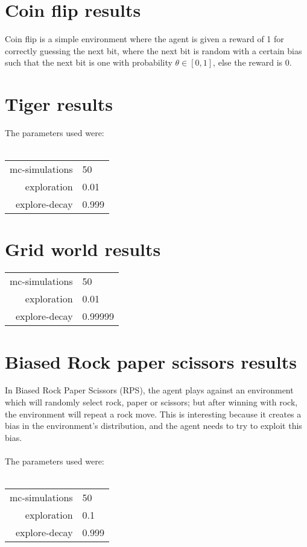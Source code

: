 \documentclass[pdftex,twoside,a4paper]{report}
\begin{document}
\section{Coin flip results}
Coin flip is a simple environment where the agent is given a reward of 1 for correctly guessing the next bit, where the next bit is random with a certain bias such that the next bit is one with probability $\theta \in [0,1]$, else the reward is 0.
\section{Tiger results}
The parameters used were:\\\\
\begin{tabular}{| r | l | }
\hline
mc-simulations & 50\\
exploration & 0.01\\
explore-decay & 0.999\\
\hline
\end{tabular}
\section{Grid world results}

\begin{tabular}{| r | l | }
\hline
mc-simulations & 50\\
exploration & 0.01\\
explore-decay & 0.99999\\
\hline
\end{tabular}
\section{Biased Rock paper scissors results}
In Biased Rock Paper Scissors (RPS), the agent plays against an environment which will randomly select rock, paper or scissors; but after winning with rock, the environment will repeat a rock move. This is interesting because it creates a bias in the environment's distribution, and the agent needs to try to exploit this bias.\\\\
The parameters used were:\\\\
\begin{tabular}{| r | l | }
\hline
mc-simulations & 50\\
exploration & 0.1\\
explore-decay & 0.999\\
\hline
\end{tabular}
\end{document}
